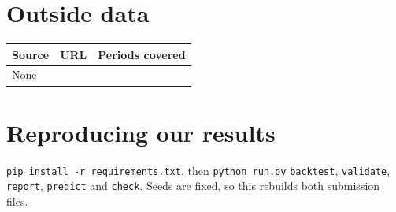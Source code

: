 \documentclass[11pt]{article}
\begin{document}
\section*{Outside data}
\begin{tabular}{lll}
\toprule
Source & URL & Periods covered \\
\midrule
None & & \\
\bottomrule
\end{tabular}

\section*{Reproducing our results}
\texttt{pip install -r requirements.txt}, then \texttt{python run.py} \texttt{backtest}, \texttt{validate},
\texttt{report}, \texttt{predict} and \texttt{check}. Seeds are fixed, so this rebuilds both submission files.
\end{document}
